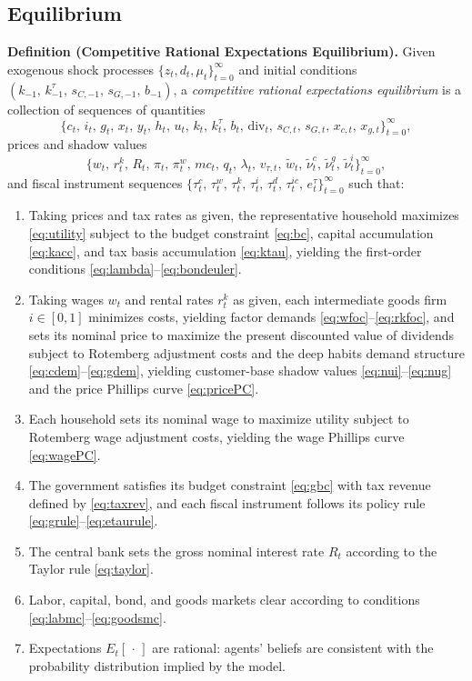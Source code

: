 \documentclass[article,11pt,letterpaper,fleqn]{article}
\theoremstyle{definition}
\numberwithin{equation}{section}
\begin{document}
\subsection{Equilibrium}

\noindent\textbf{Definition (Competitive Rational Expectations Equilibrium).} Given exogenous shock processes $\{z_t, d_t, \mu_t\}_{t=0}^{\infty}$ and initial conditions $(k_{-1},\, k_{-1}^{\tau},\, s_{C,-1},\, s_{G,-1},\, b_{-1})$, a \emph{competitive rational expectations equilibrium} is a collection of sequences of quantities
\[
\bigl\{c_t,\, i_t,\, g_t,\, x_t,\, y_t,\, h_t,\, u_t,\, k_t,\, k_t^{\tau},\, b_t,\, \text{div}_t,\, s_{C,t},\, s_{G,t},\, x_{c,t},\, x_{g,t}\bigr\}_{t=0}^{\infty},
\]
prices and shadow values
\[
\bigl\{w_t,\, r_t^k,\, R_t,\, \pi_t,\, \pi_t^w,\, mc_t,\, q_t,\, \lambda_t,\, v_{\tau,t},\, \tilde{w}_t,\, \tilde{\nu}_t^c,\, \tilde{\nu}_t^g,\, \tilde{\nu}_t^i\bigr\}_{t=0}^{\infty},
\]
and fiscal instrument sequences $\{\tau_t^c,\, \tau_t^w,\, \tau_t^k,\, \tau_t^i,\, \tau_t^d,\, \tau_t^{ic},\, e_t^{\tau}\}_{t=0}^{\infty}$ such that:
\begin{enumerate}
\item[(i)] Taking prices and tax rates as given, the representative household maximizes \eqref{eq:utility} subject to the budget constraint \eqref{eq:bc}, capital accumulation \eqref{eq:kacc}, and tax basis accumulation \eqref{eq:ktau}, yielding the first-order conditions \eqref{eq:lambda}--\eqref{eq:bondeuler}.

\item[(ii)] Taking wages $w_t$ and rental rates $r_t^k$ as given, each intermediate goods firm $i \in [0,1]$ minimizes costs, yielding factor demands \eqref{eq:wfoc}--\eqref{eq:rkfoc}, and sets its nominal price to maximize the present discounted value of dividends subject to Rotemberg adjustment costs and the deep habits demand structure \eqref{eq:cdem}--\eqref{eq:gdem}, yielding customer-base shadow values \eqref{eq:nui}--\eqref{eq:nug} and the price Phillips curve \eqref{eq:pricePC}.

\item[(iii)] Each household sets its nominal wage to maximize utility subject to Rotemberg wage adjustment costs, yielding the wage Phillips curve \eqref{eq:wagePC}.

\item[(iv)] The government satisfies its budget constraint \eqref{eq:gbc} with tax revenue defined by \eqref{eq:taxrev}, and each fiscal instrument follows its policy rule \eqref{eq:grule}--\eqref{eq:etaurule}.

\item[(v)] The central bank sets the gross nominal interest rate $R_t$ according to the Taylor rule \eqref{eq:taylor}.

\item[(vi)] Labor, capital, bond, and goods markets clear according to conditions \eqref{eq:labmc}--\eqref{eq:goodsmc}.

\item[(vii)] Expectations $E_t[\,\cdot\,]$ are rational: agents' beliefs are consistent with the probability distribution implied by the model.
\end{enumerate}
\end{document}
